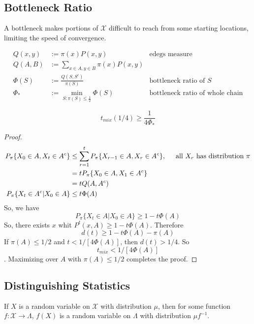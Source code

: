 \subsection{Bottleneck Ratio}
A bottleneck makes portions of $\mathcal{X}$ difficult to reach from some starting locations, limiting the speed of convergence.
\begin{define}
  \begin{align*}
    Q(x, y) &:= \pi(x)P(x, y)  & \mbox{edegs measure}\\
    Q(A, B) &:= \sum_{x\in A, y\in B} \pi(x)P(x, y) & \\
    \Phi(S) &:= \frac{Q(S, S^c)}{\pi(S)} & \mbox{bottleneck ratio of $S$}\\
    \Phi_* &:= \min_{S:\pi(S)\leq \frac{1}{2}} \Phi(S) & \mbox{bottleneck ratio of whole chain}
  \end{align*}
\end{define}
\begin{theorem}
  \[t_{mix}(1/4) \geq \frac{1}{4\Phi_*}\]
\end{theorem}
\begin{proof}
  \begin{align*}
    P_{\pi}\{X_0\in A, X_t\in A^c\} &\leq \sum_{r=1}^t P_{\pi} \{X_{r-1}\in A, X_r\in A^c\}, \hspace{0.5cm} \mbox{all $X_r$ has distribution $\pi$} \\
                                    &= tP_{\pi}\{X_0\in A, X_1\in A^c\} \\
                                    &= tQ(A, A^c) \\
    P_{\pi}\{X_t\in A^c | X_0\in A\} &\leq t\Phi(A) 
  \end{align*}
  So, we have
  \[P_{\pi}\{X_t\in A | X_0\in A\} \geq 1 - t\Phi(A)\]
  So, there exists $x$ whit $P^t(x, A) \geq 1 - t\Phi(A)$.
  Therefore
  \[d(t) \geq 1 - t\Phi(A) - \pi(A)\]
  If $\pi(A) \leq 1/2$ and $t < 1/[4\Phi(A)]$, then $d(t) > 1/4$.
  So
  \[t_{mix} < 1/[4\Phi(A)]\].
  Maximizing over $A$ with $\pi(A)\leq 1/2$ completes the proof.
\end{proof}

\subsection{Distinguishing Statistics}

\begin{fact}
  If $X$ is a random variable on $\mathcal{X}$ with distribution $\mu$,
  then for some function $f:\mathcal{X}\to\Lambda$,
  $f(X)$ is a random variable on $\Lambda$ with distribution $\mu f^{-1}$.
\end{fact}

